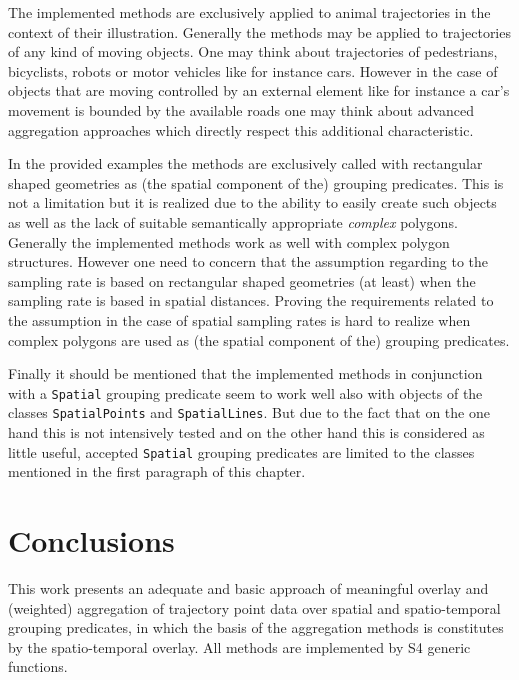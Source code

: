 \documentclass[12pt, oneside, a4paper]{scrbook}
\let\code=\texttt
\begin{document}
The implemented methods are exclusively applied to animal trajectories in the context of their illustration.
Generally the methods may be applied to trajectories of any kind of moving objects. 
One may think about trajectories of pedestrians, bicyclists, robots or motor vehicles like for instance cars. 
However in the case of objects that are moving controlled by an external element like for instance a car's movement is bounded by the available roads one may think about advanced aggregation approaches which directly respect this additional characteristic.
\par\medskip

In the provided examples the methods are exclusively called with rectangular shaped geometries as (the spatial component of the) grouping predicates.
This is not a limitation but it is realized due to the ability to easily create such objects as well as the lack of suitable semantically appropriate \textit{complex} polygons.
Generally the implemented methods work as well with complex polygon structures. 
However one need to concern that the assumption regarding to the sampling rate is based on rectangular shaped geometries (at least) when the sampling rate is based in spatial distances.
Proving the requirements related to the assumption in the case of spatial sampling rates is hard to realize when complex polygons are used as (the spatial component of the) grouping predicates.
\par\medskip

Finally it should be mentioned that the implemented methods in conjunction with a \code{Spatial} grouping predicate seem to work well also with objects of the classes \code{SpatialPoints} and \code{SpatialLines}. But due to the fact that on the one hand this is not intensively tested and on the other hand this is considered as little useful, accepted \code{Spatial} grouping predicates are limited to the classes mentioned in the first paragraph of this chapter.
\par\medskip






\chapter{Conclusions}
\label{chap:conclusions}
This work presents an adequate and basic approach of meaningful overlay and (weighted) aggregation of trajectory point data over spatial and spatio-temporal grouping predicates, 
in which the basis of the aggregation methods is constitutes by the spatio-temporal overlay.
All methods are implemented by S4 generic functions.
\par\medskip
\end{document}
